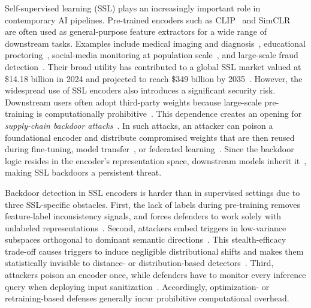 \documentclass[letterpaper,twocolumn,10pt]{article}
\begin{document}
Self-supervised learning (SSL) plays an increasingly important role in contemporary AI pipelines. Pre-trained encoders such as CLIP~\cite{CLIP} and SimCLR~\cite{chen2020simclr} are often used as general-purpose feature extractors for a wide range of downstream tasks. Examples include medical imaging and diagnosis~\cite{NEURIPS2020_949686ec, 11039780}, educational proctoring~\cite{dang2025auto}, social-media monitoring at population scale~\cite{gonzalez2023understanding}, and large-scale fraud detection~\cite{chen2024credit}. Their broad utility has contributed to a global SSL market valued at \$14.18 billion in 2024 and projected to reach \$349 billion by 2035~\cite{SSLMarket2024}. However, the widespread use of SSL encoders also introduces a significant security risk. Downstream users often adopt third-party weights because large-scale pre-training is computationally prohibitive~\cite{CLIP}. This dependence creates an opening for \textit{supply-chain backdoor attacks}~\cite{jia2022badencoder}. In such attacks, an attacker can poison a foundational encoder and distribute compromised weights that are then reused during fine-tuning, model transfer~\cite{jia2022badencoder}, or federated learning~\cite{li2021survey,jiang2022flsys}. Since the backdoor logic resides in the encoder's representation space, downstream models inherit it~\cite{saha2022backdoor}, making SSL backdoors a persistent threat.

Backdoor detection in SSL encoders is harder than in supervised settings due to three SSL-specific obstacles. First, the lack of labels during pre-training removes feature-label inconsistency signals, and forces defenders to work solely with unlabeled representations~\cite{298036}. Second, attackers embed triggers in low-variance subspaces orthogonal to dominant semantic directions~\cite{zhang2025invisible}. This stealth-efficacy trade-off causes triggers to induce negligible distributional shifts and makes them statistically invisible to distance- or distribution-based detectors~\cite{tao2024distribution}. Third, attackers poison an encoder once, while defenders have to monitor every inference query when deploying input sanitization~\cite{Huang2025DBSSL}. Accordingly, optimization- or retraining-based defenses generally incur prohibitive computational overhead.

 
\end{document}
